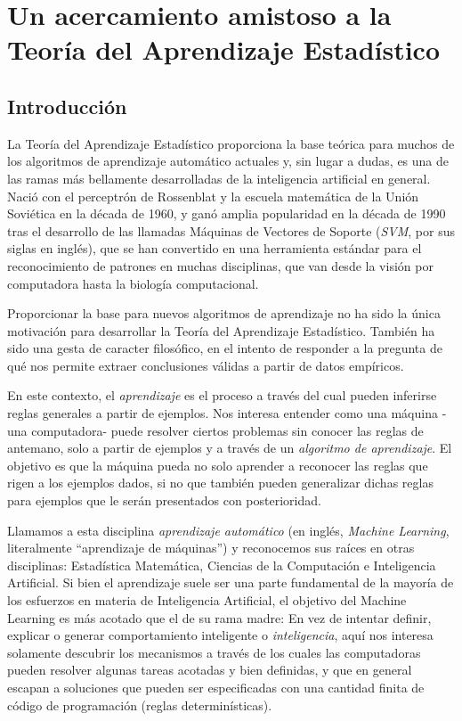 \documentclass{report}
\begin{document}
\chapter[Introducción a la Teoría del Aprendizaje Estadístico]{Un acercamiento amistoso a la Teoría del Aprendizaje Estadístico}
\section{Introducción}
La Teoría del Aprendizaje Estadístico proporciona la base teórica para muchos de los algoritmos de aprendizaje automático actuales y,
sin lugar a dudas, es una de las ramas más bellamente desarrolladas de la inteligencia artificial en general. Nació con el perceptrón de Rossenblat
y la escuela matemática de la Unión Soviética en la década de 1960, y ganó amplia popularidad en la década de 1990 tras el desarrollo de las llamadas
Máquinas de Vectores de Soporte (\textit{SVM}, por sus siglas en inglés), que se han convertido en una herramienta estándar para el reconocimiento de
patrones en muchas disciplinas, que van desde la visión por computadora hasta la biología computacional.

Proporcionar la base para nuevos algoritmos de aprendizaje no ha sido la única motivación para desarrollar la Teoría del Aprendizaje
Estadístico. También ha sido una gesta de caracter filosófico, en el intento de responder a la pregunta de qué nos permite extraer conclusiones válidas
a partir de datos empíricos.


En este contexto, el \textit{aprendizaje} es el proceso a través del cual pueden inferirse reglas generales a partir de ejemplos. Nos interesa
entender como una máquina -una computadora- puede resolver ciertos problemas sin conocer las reglas de antemano, solo a partir de ejemplos y a través
de un \textit{algoritmo de aprendizaje}. El objetivo es que la máquina pueda no solo aprender a reconocer las reglas que rigen a los ejemplos dados,
si no que también pueden generalizar dichas reglas para ejemplos que le serán presentados con posterioridad.

Llamamos a esta disciplina \textit{aprendizaje automático} (en inglés, \textit{Machine Learning}, literalmente ``aprendizaje de máquinas'') y reconocemos
sus raíces en otras disciplinas: Estadística Matemática, Ciencias de la Computación e Inteligencia Artificial. Si bien el aprendizaje suele ser una
parte fundamental de la mayoría de los esfuerzos en materia de Inteligencia Artificial, el objetivo del Machine Learning es más acotado que el de su
rama madre: En vez de intentar definir, explicar o generar comportamiento inteligente o \textit{inteligencia}, aquí nos interesa solamente descubrir los mecanismos
a través de los cuales las computadoras pueden resolver algunas tareas acotadas y bien definidas, y que en general escapan a soluciones que pueden
ser especificadas con una cantidad finita de código de programación (reglas determinísticas).
\end{document}
